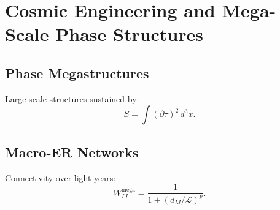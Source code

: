 \chapter{Cosmic Engineering and Mega-Scale Phase Structures}

\section{Phase Megastructures}
Large-scale structures sustained by:
\[
S = \int (\partial\tau)^2\, d^3x.
\]

\section{Macro-ER Networks}
Connectivity over light-years:
\[
W_{IJ}^{\mathrm{mega}} = \frac{1}{1 + (d_{IJ}/\mathcal{L})^p }.
\]
